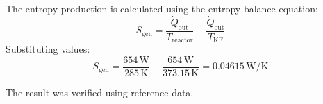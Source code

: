 The entropy production is calculated using the entropy balance equation:  
\[
\dot{S}_{\text{gen}} = \frac{\dot{Q}_{\text{out}}}{T_{\text{reactor}}} - \frac{\dot{Q}_{\text{out}}}{T_{\text{KF}}}  
\]  
Substituting values:  
\[
\dot{S}_{\text{gen}} = \frac{654 \, \text{W}}{285 \, \text{K}} - \frac{654 \, \text{W}}{373.15 \, \text{K}} = 0.04615 \, \text{W/K}
\]  

The result was verified using reference data.